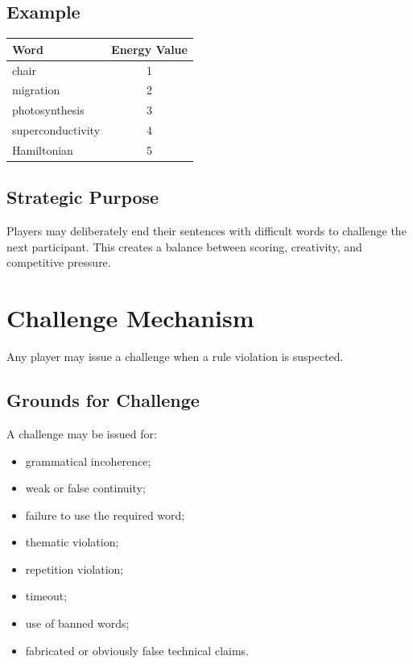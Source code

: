 \documentclass[11pt,a4paper]{article}
\begin{document}
\subsection{Example}

\begin{center}
\begin{tabular}{lc}
\toprule
\textbf{Word} & \textbf{Energy Value} \\
\midrule
chair & 1 \\
migration & 2 \\
photosynthesis & 3 \\
superconductivity & 4 \\
Hamiltonian & 5 \\
\bottomrule
\end{tabular}
\end{center}

\subsection{Strategic Purpose}

Players may deliberately end their sentences with difficult words to challenge the next participant. This creates a balance between scoring, creativity, and competitive pressure.

\section{Challenge Mechanism}

Any player may issue a challenge when a rule violation is suspected.

\subsection{Grounds for Challenge}

A challenge may be issued for:

\begin{itemize}
    \item grammatical incoherence;
    \item weak or false continuity;
    \item failure to use the required word;
    \item thematic violation;
    \item repetition violation;
    \item timeout;
    \item use of banned words;
    \item fabricated or obviously false technical claims.
\end{itemize}
\end{document}
